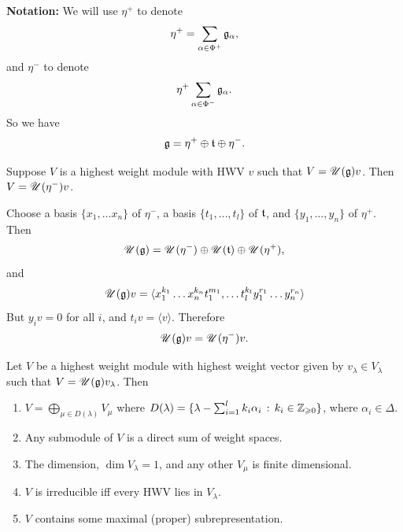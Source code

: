 \documentclass{article}
\begin{document}
\textbf{Notation:} \gap 
We will use $\eta^{+}$ to denote \[ \eta^{+} = \sum_{\alpha \in \Phi^{+}} \mathfrak{g}_{\alpha},\] and $\eta^{-}$ to denote \[ \eta^{+} \sum_{\alpha \in \Phi^{-}} \mathfrak{g}_{\alpha}.\] So we have \[ \mathfrak{g} = \eta^{+} \oplus \mathfrak{t} \oplus \eta^{-}.\]
\begin{fancylem}{}
    Suppose $V$ is a highest weight module with HWV $v$ such that $V=\mathscr{U}(\mathfrak{g})v$. Then $V = \mathscr{U}(\eta^{-})v$.
\end{fancylem}
\proof Choose a basis $\{x_{1}, \dots x_{n}\}$ of $\eta^{-}$, a basis $\{t_{1}, \dots, t_{l}\}$ of $\mathfrak{t}$, and $\{y_{1}, \dots, y_{n}\}$ of $\eta^{+}$. Then \[ \mathscr{U}(\mathfrak{g}) = \mathscr{U}(\eta^{-}) \oplus \mathscr{U}(\mathfrak{t}) \oplus \mathscr{U}(\eta^{+}),\] and \[\mathscr{U}(\mathfrak{g})v = \langle x_{1}^{k_{1}}\dots x_{n}^{k_{n}}t_{1}^{m_{1}},\dots t_{l}^{k_{l}}y_{1}^{r_{1}}\dots y_{n}^{r_{n}}\rangle\]
But $y_{i}v=0$ for all $i$, and $t_{i}v = \langle v \rangle$. Therefore \[ \mathscr{U}(\mathfrak{g})v = \mathscr{U}(\eta^{-})v.\]
\begin{fancyprop}{}
    Let $V$ be a highest weight module with highest weight vector given by $v_{\lambda} \in V_{\lambda}$ such that $V = \mathscr{U}(\mathfrak{g})v_{\lambda}$. Then \begin{enumerate}
        \item $V = \bigoplus_{\mu \in D(\lambda)} V_{\mu}$ where $D(\lambda) = \{ \lambda - \sum_{i=1}^{l} k_{i}\alpha_{i} \, : \, k_{i} \in \mathbb{Z}_{\geqslant 0}\}$, where $\alpha_{i} \in \Delta$.
        \item Any submodule of $V$ is a direct sum of weight spaces.
        \item The dimension, $\dim V_{\lambda} = 1$, and any other $V_{\mu}$ is finite dimensional.
        \item $V$ is irreducible iff every HWV lies in $V_{\lambda}.$
        \item $V$ contains some maximal (proper) subrepresentation.
    \end{enumerate}
\end{fancyprop}
\proof \hspace{0.1cm}
\end{document}
